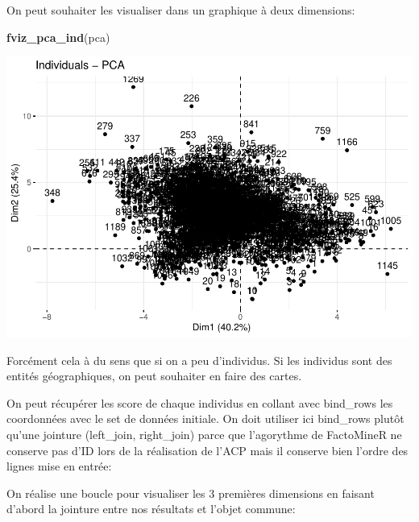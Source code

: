 \documentclass[
]{book}
\newenvironment{Shaded}{\begin{snugshade}}{\end{snugshade}}
\newcommand{\FunctionTok}[1]{\textcolor[rgb]{0.13,0.29,0.53}{\textbf{#1}}}
\newcommand{\NormalTok}[1]{#1}
\newcommand{\OtherTok}[1]{\textcolor[rgb]{0.56,0.35,0.01}{#1}}
\newcommand{\SpecialCharTok}[1]{\textcolor[rgb]{0.81,0.36,0.00}{\textbf{#1}}}
\begin{document}
On peut souhaiter les visualiser dans un graphique à deux dimensions:

\begin{Shaded}
\begin{Highlighting}[]
\FunctionTok{fviz\_pca\_ind}\NormalTok{(pca)}
\end{Highlighting}
\end{Shaded}

\includegraphics{manuel_geo_quanti_files/figure-latex/unnamed-chunk-73-1.pdf}

Forcément cela à du sens que si on a peu d'individus. Si les individus sont des entités géographiques, on peut souhaiter en faire des cartes.

On peut récupérer les score de chaque individus en collant avec bind\_rows les coordonnées avec le set de données initiale. On doit utiliser ici bind\_rows plutôt qu'une jointure (left\_join, right\_join) parce que l'agorythme de FactoMineR ne conserve pas d'ID lors de la réalisation de l'ACP mais il conserve bien l'ordre des lignes mise en entrée:

\begin{Shaded}
\end{Shaded}

On réalise une boucle pour visualiser les 3 premières dimensions en faisant d'abord la jointure entre nos résultats et l'objet commune:
\end{document}
